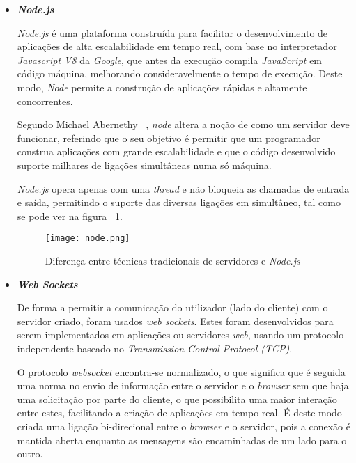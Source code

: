 \begin{itemize}

\item \textbf{\textit{Node.js}}


\textit{Node.js} é uma plataforma construída para facilitar o desenvolvimento de aplicações de alta escalabilidade em tempo real, com base no interpretador \textit{Javascript V8} da \textit{Google}, que antes da execução compila \textit{JavaScript} em código máquina, melhorando consideravelmente o tempo de execução. Deste modo, \textit{Node} permite a construção de aplicações rápidas e altamente concorrentes.

Segundo Michael Abernethy ~\cite{Abernethy2011}, \textit{node} altera a noção de como um servidor deve funcionar, referindo que o seu objetivo é permitir que um programador construa aplicações com grande escalabilidade e que o código desenvolvido suporte milhares de ligações simultâneas numa só máquina.

\textit{Node.js} opera apenas com uma \textit{thread} e não bloqueia as chamadas de entrada e saída, permitindo o suporte das diversas ligações em simultâneo, tal como se pode ver na figura ~\ref{fig:node}.

\begin{figure}[ht]
\centering
\texttt{[image: node.png]}
\caption[\textit{Node.js}] {Diferença entre técnicas tradicionais de servidores e \textit{Node.js}\protect\footnotemark}
\label{fig:node}
\end{figure}


\pagebreak

\item \textbf{\textit{Web Sockets}}

De forma a permitir a comunicação do utilizador (lado do cliente) com o servidor criado, foram usados \textit{web sockets}. Estes foram desenvolvidos para serem implementados em aplicações ou servidores \textit{web}, usando um protocolo independente baseado no \textit{Transmission Control Protocol (TCP)}.

O protocolo \textit{websocket} encontra-se normalizado, o que significa que é seguida uma norma no envio de informação entre o servidor e o \textit{browser} sem que haja uma solicitação por parte do cliente, o que possibilita uma maior interação entre estes, facilitando a criação de aplicações em tempo real. É deste modo criada uma ligação bi-direcional entre o \textit{browser} e o servidor, pois a conexão é mantida aberta enquanto as mensagens são encaminhadas de um lado para o outro.



\end{itemize}
